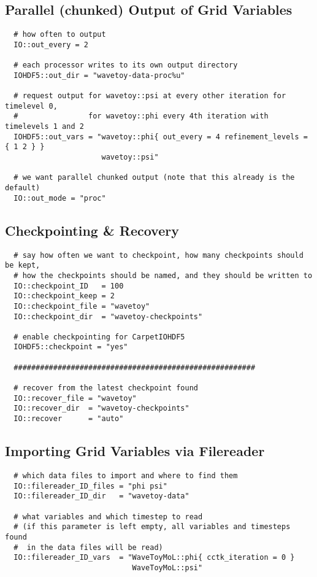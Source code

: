 \documentclass{article}
\begin{document}
\subsection{Parallel (chunked) Output of Grid Variables}

\begin{verbatim}
  # how often to output
  IO::out_every = 2

  # each processor writes to its own output directory
  IOHDF5::out_dir = "wavetoy-data-proc%u"

  # request output for wavetoy::psi at every other iteration for timelevel 0,
  #                for wavetoy::phi every 4th iteration with timelevels 1 and 2
  IOHDF5::out_vars = "wavetoy::phi{ out_every = 4 refinement_levels = { 1 2 } }
                      wavetoy::psi"

  # we want parallel chunked output (note that this already is the default)
  IO::out_mode = "proc"
\end{verbatim}

\subsection{Checkpointing \& Recovery}

\begin{verbatim}
  # say how often we want to checkpoint, how many checkpoints should be kept,
  # how the checkpoints should be named, and they should be written to
  IO::checkpoint_ID   = 100
  IO::checkpoint_keep = 2
  IO::checkpoint_file = "wavetoy"
  IO::checkpoint_dir  = "wavetoy-checkpoints"

  # enable checkpointing for CarpetIOHDF5
  IOHDF5::checkpoint = "yes"

  #######################################################

  # recover from the latest checkpoint found
  IO::recover_file = "wavetoy"
  IO::recover_dir  = "wavetoy-checkpoints"
  IO::recover      = "auto"
\end{verbatim}

\subsection{Importing Grid Variables via Filereader}

\begin{verbatim}
  # which data files to import and where to find them
  IO::filereader_ID_files = "phi psi"
  IO::filereader_ID_dir   = "wavetoy-data"

  # what variables and which timestep to read
  # (if this parameter is left empty, all variables and timesteps found
  #  in the data files will be read)
  IO::filereader_ID_vars  = "WaveToyMoL::phi{ cctk_iteration = 0 }
                             WaveToyMoL::psi"
\end{verbatim}
\end{document}
